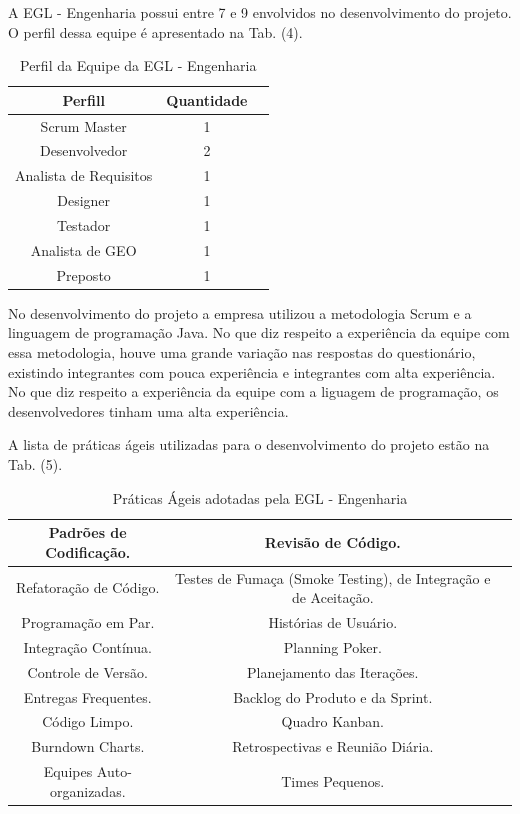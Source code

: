A EGL - Engenharia possui entre 7 e 9 envolvidos no desenvolvimento do projeto.  O perfil dessa equipe é apresentado na Tab. (4).

\begin{table}[H]
\center
\footnotesize
\begin{tabular}{|c|c|c|}
\hline
\textbf{Perfill}          & \textbf{Quantidade}  \\ \hline
Scrum Master               &  1                  \\ \hline
Desenvolvedor       &  2               \\ \hline
Analista de Requisitos              &   1                \\ \hline
Designer            &   1              \\ \hline
Testador            &  1               \\ \hline
Analista de GEO              &  1               \\ \hline
Preposto   &  1               \\ \hline
\end{tabular}
\caption{Perfil da Equipe da EGL - Engenharia}
\end{table}


No desenvolvimento do projeto a empresa utilizou a metodologia Scrum e a linguagem de programação Java. No que diz respeito a experiência da equipe com essa metodologia, houve uma grande variação nas respostas do questionário, existindo integrantes com pouca experiência e integrantes com alta experiência. No que diz respeito a experiência da equipe com a liguagem de programação, os desenvolvedores tinham uma alta experiência.

A lista de práticas ágeis utilizadas para o desenvolvimento do projeto estão na Tab. (5).

\begin{table}[H]
\center
\footnotesize
\begin{tabular}{|c|c|c|}
\hline
Padrões de Codificação.              &   Revisão de Código.                \\ \hline
Refatoração de Código.     &  Testes de Fumaça (Smoke Testing), de Integração e de Aceitação.            \\ \hline
 Programação em Par.              &   Histórias de Usuário.               \\ \hline
Integração Contínua.         &   Planning Poker.             \\ \hline
Controle de Versão.          &   Planejamento das Iterações.               \\ \hline
Entregas Frequentes.            &   Backlog do Produto e da Sprint.             \\ \hline
 Código Limpo.   &  Quadro Kanban.            \\ \hline
Burndown Charts.   &  Retrospectivas e Reunião Diária.        \\ \hline
Equipes Auto-organizadas.   &  Times Pequenos.           \\ \hline
\end{tabular}
\caption{Práticas Ágeis adotadas pela EGL - Engenharia}
\end{table}


